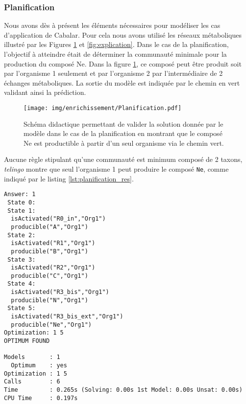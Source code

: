 \documentclass[../main.tex]{subfiles}
\begin{document}
\subsubsection*{Planification}
Nous avons dès à présent les éléments nécessaires pour modéliser les cas d'application de Cabalar. Pour cela nous avons utilisé les réseaux métaboliques illustré par les Figures \ref{fig:planification} et \ref{fig:explication}. Dans le cas de la planification, l'objectif à atteindre était de déterminer la communauté minimale pour la production du composé Ne. Dans la figure \ref{fig:planification}, ce composé peut être produit soit par l'organisme 1 seulement et par l'organisme 2 par l'intermédiaire de 2 échanges métaboliques. La sortie du modèle est indiquée par le chemin en vert validant ainsi la prédiction.

\begin{figure}[H]
    \begin{center}
        \texttt{[image: img/enrichissement/Planification.pdf]}
            \caption{Schéma didactique permettant de valider la solution donnée par le modèle dans le cas de la planification en montrant que le composé Ne est productible à partir d'un seul organisme via le chemin vert.}
        \label{fig:planification}
    \end{center}
\end{figure}

Aucune règle stipulant qu'une communauté est minimum composé de 2 taxons, \textit{telingo} montre que seul l'organisme 1 peut produire le composé \texttt{Ne}, comme indiqué par le listing \ref{lst:planification_res}.

\begin{lstlisting}[label =lst:planification_res, caption =Résultat de la planification obtenue après application des règles sur la base de faits, captionpos=b]
Answer: 1
 State 0:
 State 1:
  isActivated("R0_in","Org1")
  producible("A","Org1")
 State 2:
  isActivated("R1","Org1")
  producible("B","Org1")
 State 3:
  isActivated("R2","Org1")
  producible("C","Org1")
 State 4:
  isActivated("R3_bis","Org1")
  producible("N","Org1")
 State 5:
  isActivated("R3_bis_ext","Org1")
  producible("Ne","Org1")
Optimization: 1 5
OPTIMUM FOUND

Models       : 1
  Optimum    : yes
Optimization : 1 5
Calls        : 6
Time         : 0.265s (Solving: 0.00s 1st Model: 0.00s Unsat: 0.00s)
CPU Time     : 0.197s
\end{lstlisting}
\end{document}

